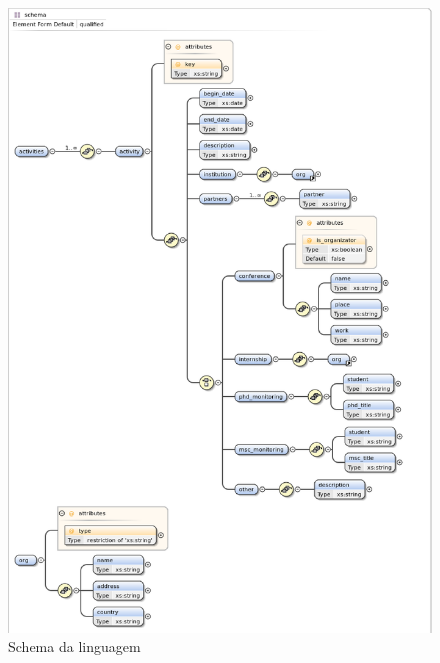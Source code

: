 \documentclass[a4paper,11pt,openright,openbib]{article}
\begin{document}
\begin{figure}[!ht]
\centering
\includegraphics[scale=0.70]{cv_activities_schema.eps}
\caption{Schema da linguagem}
\label{fig:cv_activities}
\end{figure}
\end{document}
